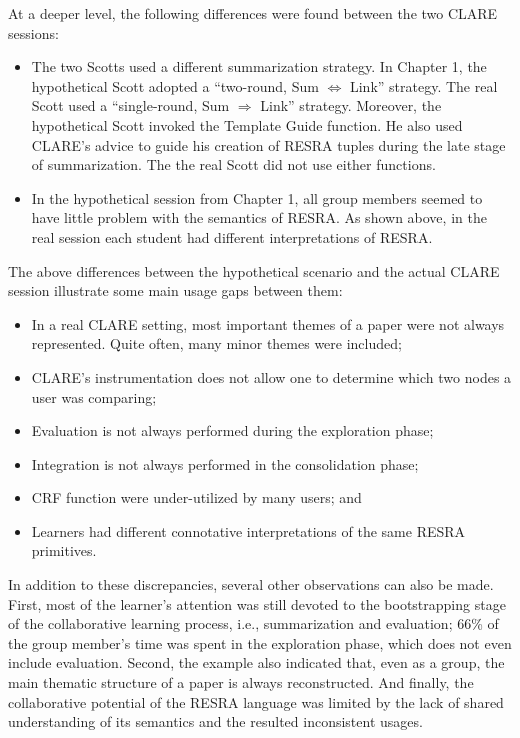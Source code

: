 At a deeper level, the following differences were found between the two
CLARE sessions:

\begin{itemize}
\item The two Scotts used a different summarization strategy. In Chapter
  1, the hypothetical Scott adopted a ``two-round, {\sf Sum\/}
  \(\Leftrightarrow\) {\sf Link\/}'' strategy. The real Scott used a
  ``single-round, {\sf Sum\/} \(\Rightarrow\) {\sf Link\/}'' strategy.
  Moreover, the hypothetical Scott invoked the {\sf Template Guide\/}
  function. He also used CLARE's advice to guide his creation of RESRA
  tuples during the late stage of summarization. The the real Scott did
  not use either functions.
  
\item In the hypothetical session from Chapter 1, all group members
  seemed to have little problem with the semantics of RESRA. As shown
  above, in the real session each student had different interpretations of
  RESRA. 
\end{itemize}

The above differences between the hypothetical scenario and the
actual CLARE session illustrate some main usage gaps between them:

\begin{itemize}
\item In a real CLARE setting, most important themes of a paper were not
  always represented. Quite often, many minor themes were included;
  
\item CLARE's instrumentation does not allow one to determine which two
  nodes a user was comparing;

\item Evaluation is not always performed during the exploration phase;

\item Integration is not always performed in the consolidation phase;
  
\item CRF function were under-utilized by many users; and
  
\item Learners had different connotative interpretations of the same RESRA
  primitives.
\end{itemize}

In addition to these discrepancies, several other observations can also be
made. First, most of the learner's attention was still devoted to the
bootstrapping stage of the collaborative learning process, i.e.,
summarization and evaluation; 66\% of the group member's time was spent in
the exploration phase, which does not even include evaluation. Second, the
example also indicated that, even as a group, the main thematic structure
of a paper is always reconstructed. And finally, the collaborative
potential of the RESRA language was limited by the lack of shared
understanding of its semantics and the resulted inconsistent usages.



